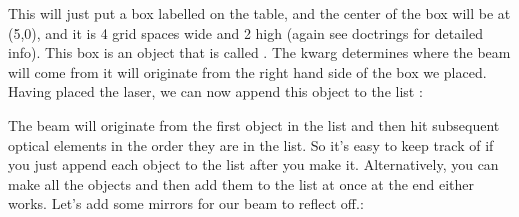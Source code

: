 \documentclass[letterpaper,10pt,english]{sphinxmanual}
\begin{document}
\begin{sphinxVerbatim}[commandchars=\\\{\}]
         
\end{sphinxVerbatim}

\sphinxAtStartPar
This will just put a box labelled  on the table, and the center of the box will be at (\sphinxhyphen{}5,0), and it is 4 grid spaces wide and 2 high (again see doctrings for detailed info). This box is an  object that is called . The  kwarg determines where the beam will come from \sphinxhyphen{} it will originate from the right hand side of the box we placed. Having placed the laser, we can now append this object to the list :

\begin{sphinxVerbatim}[commandchars=\\\{\}]
\end{sphinxVerbatim}

\sphinxAtStartPar
The beam will originate from the first object in the list  and then hit subsequent optical elements in the order they are in the list. So it’s easy to keep track of if you just append each object to the list after you make it. Alternatively, you can make all the objects and then add them to the list at once at the end \sphinxhyphen{} either works. Let’s add some mirrors for our beam to reflect off.:
\end{document}
